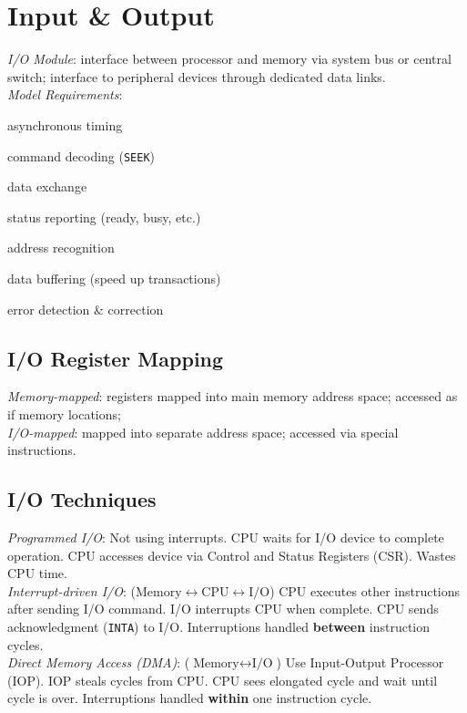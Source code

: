 \section{Input \& Output}

\emph{I/O Module}: interface between processor and memory via system bus or central
switch; interface to peripheral devices through dedicated data links.\\
\emph{Model Requirements}: \begin{enuminline}
\item asynchronous timing
\item command decoding (\eg\texttt{SEEK})
\item data exchange
\item status reporting (\eg ready, busy, etc.)
\item address recognition
\item data buffering (speed up transactions)
\item error detection \& correction
\end{enuminline}

\subsection*{I/O Register Mapping}

\emph{Memory-mapped}: registers mapped into main memory address space; accessed as if
memory locations;\\
\emph{I/O-mapped}: mapped into separate address space; accessed via special instructions.

\subsection*{I/O Techniques}

\emph{Programmed I/O}:
Not using interrupts. CPU waits for I/O device to complete operation. CPU accesses device
via Control and Status Registers (CSR). Wastes CPU time.\\
\emph{Interrupt-driven I/O}:
($\text{Memory} \leftrightarrow \text{CPU} \leftrightarrow \text{I/O}$) CPU executes
other instructions after sending I/O command. I/O interrupts CPU when complete. CPU
sends acknowledgment (\texttt{INTA}) to I/O.
Interruptions handled \textbf{between} instruction cycles.\\
\emph{Direct Memory Access (DMA)}:
($\text{Memory} \leftrightarrow \text{I/O}$) Use Input-Output Processor (IOP). IOP
steals cycles from CPU. CPU sees elongated cycle and wait until cycle is over.
Interruptions handled \textbf{within} one instruction cycle.